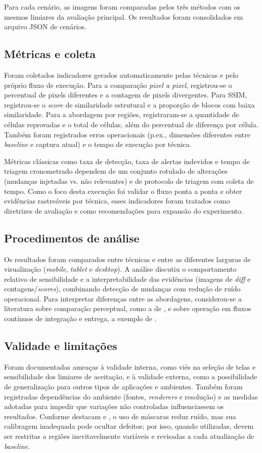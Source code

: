 \documentclass{UNESC}
\begin{document}
Para cada cenário, as imagens foram comparadas pelos três métodos com os mesmos limiares da avaliação principal. Os resultados foram consolidados em arquivo JSON de cenários.

\subsection{Métricas e coleta}
Foram coletados indicadores gerados automaticamente pelas técnicas e pelo próprio fluxo de execução. Para a comparação \emph{pixel a pixel}, registrou-se o percentual de pixels diferentes e a contagem de pixels divergentes. Para SSIM, registrou-se o \emph{score} de similaridade estrutural e a proporção de blocos com baixa similaridade. Para a abordagem por regiões, registraram-se a quantidade de células reprovadas e o total de células, além do percentual de diferença por célula. Também foram registrados erros operacionais (p.ex., dimensões diferentes entre \emph{baseline} e captura atual) e o tempo de execução por técnica.

Métricas clássicas como taxa de detecção, taxa de alertas indevidos e tempo de triagem cronometrado dependem de um conjunto rotulado de alterações (mudanças injetadas vs. não relevantes) e de protocolo de triagem com coleta de tempo. Como o foco desta execução foi validar o fluxo ponta a ponta e obter evidências rastreáveis por técnica, esses indicadores foram tratados como diretrizes de avaliação e como recomendações para expansão do experimento.

\subsection{Procedimentos de análise}
Os resultados foram comparados entre técnicas e entre as diferentes larguras de visualização (\textit{mobile}, \textit{tablet} e \textit{desktop}). A análise discutiu o comportamento relativo de sensibilidade e a interpretabilidade das evidências (imagens de \emph{diff} e contagens/\emph{scores}), combinando detecção de mudanças com redução de ruído operacional. Para interpretar diferenças entre as abordagens, considerou-se a literatura sobre comparação perceptual, como a de , e sobre operação em fluxos contínuos de integração e entrega, a exemplo de .

\subsection{Validade e limitações}
Foram documentadas ameaças à validade interna, como viés na seleção de telas e sensibilidade dos limiares de aceitação, e à validade externa, como a possibilidade de generalização para outros tipos de aplicações e ambientes. Também foram registradas dependências do ambiente (fontes, \emph{renderers} e resolução) e as medidas adotadas para impedir que variações não controladas influenciassem os resultados. Conforme destacam  e , o uso de máscaras reduz ruído, mas sua calibragem inadequada pode ocultar defeitos; por isso, quando utilizadas, devem ser restritas a regiões inevitavelmente variáveis e revisadas a cada atualização de \emph{baseline}.
\end{document}
